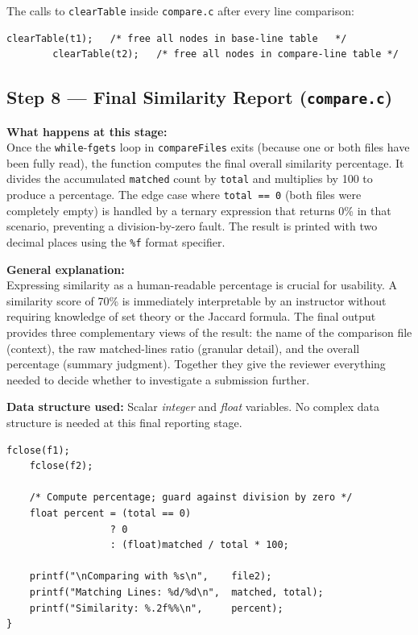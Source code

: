 \documentclass[12pt,a4paper]{article}
\begin{document}
The calls to \texttt{clearTable} inside \texttt{compare.c} after every line comparison:

\begin{lstlisting}[caption={\texttt{compare.c} -- Clearing both hash tables after each line-pair}]
        clearTable(t1);   /* free all nodes in base-line table   */
        clearTable(t2);   /* free all nodes in compare-line table */
\end{lstlisting}

\subsection{Step 8 — Final Similarity Report (\texttt{compare.c})}

\textbf{What happens at this stage:}\\
Once the \texttt{while}-\texttt{fgets} loop in \texttt{compareFiles} exits (because one or both files have been fully read), the function computes the final overall similarity percentage. It divides the accumulated \texttt{matched} count by \texttt{total} and multiplies by 100 to produce a percentage. The edge case where \texttt{total == 0} (both files were completely empty) is handled by a ternary expression that returns 0\% in that scenario, preventing a division-by-zero fault. The result is printed with two decimal places using the \texttt{\%f} format specifier.

\smallskip
\textbf{General explanation:}\\
Expressing similarity as a human-readable percentage is crucial for usability. A similarity score of 70\% is immediately interpretable by an instructor without requiring knowledge of set theory or the Jaccard formula. The final output provides three complementary views of the result: the name of the comparison file (context), the raw matched-lines ratio (granular detail), and the overall percentage (summary judgment). Together they give the reviewer everything needed to decide whether to investigate a submission further.

\smallskip
\textbf{Data structure used:} Scalar \textit{integer} and \textit{float} variables. No complex data structure is needed at this final reporting stage.

\begin{lstlisting}[caption={\texttt{compare.c} -- Computing and printing the final similarity report}]
    fclose(f1);
    fclose(f2);

    /* Compute percentage; guard against division by zero */
    float percent = (total == 0)
                  ? 0
                  : (float)matched / total * 100;

    printf("\nComparing with %s\n",    file2);
    printf("Matching Lines: %d/%d\n",  matched, total);
    printf("Similarity: %.2f%%\n",     percent);
}
\end{lstlisting}
\end{document}
